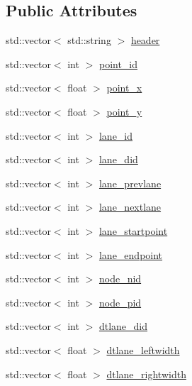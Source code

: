 \subsection*{Public Attributes}
\begin{DoxyCompactItemize}
\item 
std\+::vector$<$ std\+::string $>$ \hyperlink{structVectorMap_ab3f44a33bb23f1acaf5abebdc8862319}{header}
\item 
std\+::vector$<$ int $>$ \hyperlink{structVectorMap_ac0309f6f1c51b9238e6784ce3e2e4dfc}{point\+\_\+id}
\item 
std\+::vector$<$ float $>$ \hyperlink{structVectorMap_af669a9afada9f21f7984d78acd285702}{point\+\_\+x}
\item 
std\+::vector$<$ float $>$ \hyperlink{structVectorMap_a46e5e54fff8de0238e1bb033e549c61b}{point\+\_\+y}
\item 
std\+::vector$<$ int $>$ \hyperlink{structVectorMap_a07be892433c67a7b3169846356ab1594}{lane\+\_\+id}
\item 
std\+::vector$<$ int $>$ \hyperlink{structVectorMap_ad7719454cb3163d298337f25840e6e8f}{lane\+\_\+did}
\item 
std\+::vector$<$ int $>$ \hyperlink{structVectorMap_af72b5715a477e661e368783b4b9c80ce}{lane\+\_\+prevlane}
\item 
std\+::vector$<$ int $>$ \hyperlink{structVectorMap_a3959e449a67ceed8b8ba7a01c206276f}{lane\+\_\+nextlane}
\item 
std\+::vector$<$ int $>$ \hyperlink{structVectorMap_a8973486b8a486481b15a786af7256da8}{lane\+\_\+startpoint}
\item 
std\+::vector$<$ int $>$ \hyperlink{structVectorMap_a884a3a96983f3552b8a4c8c91efad56c}{lane\+\_\+endpoint}
\item 
std\+::vector$<$ int $>$ \hyperlink{structVectorMap_a17f0332cbc808f577931ce83b0101ebf}{node\+\_\+nid}
\item 
std\+::vector$<$ int $>$ \hyperlink{structVectorMap_a7dd4c629e1d068603dba6c8364c8e5c8}{node\+\_\+pid}
\item 
std\+::vector$<$ int $>$ \hyperlink{structVectorMap_ab6b4b7ed469da2293f0b9a01b87ebe8e}{dtlane\+\_\+did}
\item 
std\+::vector$<$ float $>$ \hyperlink{structVectorMap_a8c3af33179a0c1b73206170cfc03e3c0}{dtlane\+\_\+leftwidth}
\item 
std\+::vector$<$ float $>$ \hyperlink{structVectorMap_aa24f03c23fb7eae7e0f7f9b96e8928b4}{dtlane\+\_\+rightwidth}
\end{DoxyCompactItemize}


